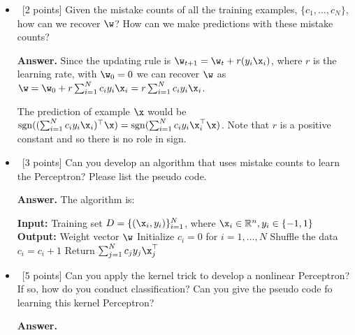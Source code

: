 \documentclass[12pt, fullpage,letterpaper]{article}
\begin{document}
\begin{enumerate}
	\begin{itemize}
		\item~[2 points] Given the mistake counts of all the training examples, $\{c_1, \ldots, c_N\}$, how can we recover $\w$? How can we make predictions with these mistake counts? 
		
\item[{\bf Answer.}] Since the updating rule is $\w_{t+1} = \w_t + r (y_i \x_i)$, where $r$ is the learning rate, with $\w_0 = 0$ we can recover $\w$ as $\w = \w_0 + r \sum_{i=1}^N c_i y_i \x_i = r \sum_{i=1}^N c_i y_i \x_i$.

The prediction of example $\x$ would be ${\rm sgn}((\sum_{i=1}^N c_i y_i \x_i )^{\top} \x) = {\rm sgn}(\sum_{i=1}^N c_i y_i \x_i^{\top} \x)$. Note that $r$ is a positive constant and so there is no role in sign. 

		\item~[3 points] Can you develop an algorithm that uses mistake counts to learn the Perceptron? Please list the pseudo code. 
		
\item[{\bf Answer.}] The algorithm is: 

\begin{algorithm}[H]
\SetAlgoLined
 {\bf Input:} Training set $D = \{(\x_i, y_i)\}_{i=1}^N$, where $\x_i \in \mathbb{R}^n, y_i \in \{-1,1\}$\;
 {\bf Output:} Weight vector $\w$\;
Initialize $c_i = 0$ for $i = 1, \ldots, N$\;
	{Shuffle the data\vspace{0.1cm}\;
	{
		{
		{$c_i = c_i +1$}}}}
Return $\sum_{j=1}^N c_j y_j \x_j^{\top}$
\end{algorithm}


		\item~[5 points] Can you apply the kernel trick to develop a nonlinear Perceptron? If so, how do you conduct classification? Can you give the pseudo code fo learning this kernel Perceptron? 
		
\item[{\bf Answer.}]

	\end{itemize}   
	
\end{enumerate}

\end{document}
